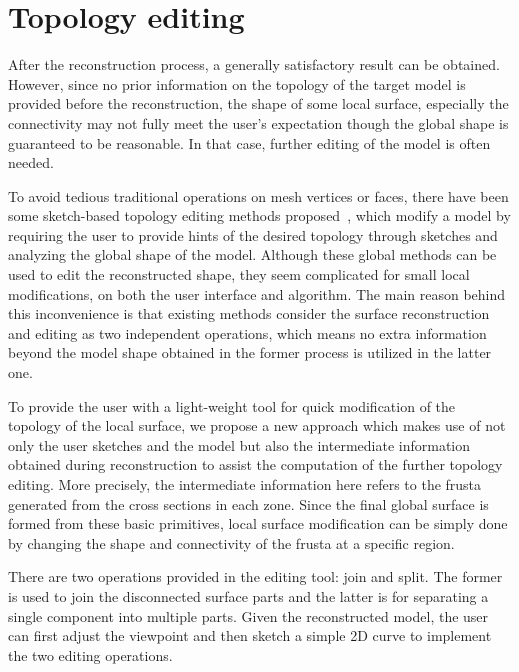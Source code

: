 \section{Topology editing}
\label{ch6:sec:edit}

After the reconstruction  process, a generally satisfactory result
can be obtained. However, since no prior information on the topology
of the target model is provided before the reconstruction, the shape
of some local surface, especially the connectivity may not fully
meet the user's expectation though the global shape is guaranteed to
be reasonable. In that case, further editing of the model is often
needed.

To avoid tedious traditional  operations on mesh vertices or faces,
there have been some sketch-based topology editing methods
proposed~\cite{HRABV11,JT09,JZH07}, which modify a model by
requiring the user to provide hints of the desired topology through
sketches and analyzing the global shape of the model. Although these
global methods can be used to edit the reconstructed shape, they
seem complicated for small local modifications, on both the user
interface and algorithm. The main reason behind this inconvenience
is that existing methods consider the surface reconstruction and
editing as two independent operations, which means no extra
information beyond the model shape obtained in the former process is
utilized in the latter one.

To provide the user with a light-weight tool for quick modification of
the topology of the local surface, we propose a new approach which
makes use of not only the user sketches and the model but also the
intermediate information obtained during reconstruction to assist
the computation of the further topology editing. More precisely, the
intermediate information here refers to the frusta generated from
the cross sections in each zone. Since the final global surface is
formed from these basic primitives, local surface modification can
be simply done by changing the shape and connectivity of the frusta
at a specific region.

There are two operations provided in  the editing tool: join and
split. The former is used to join the disconnected surface parts and
the latter is for separating a single component into multiple parts.
Given the reconstructed model, the user can first adjust the
viewpoint and then sketch a simple 2D curve to implement the two
editing operations.


